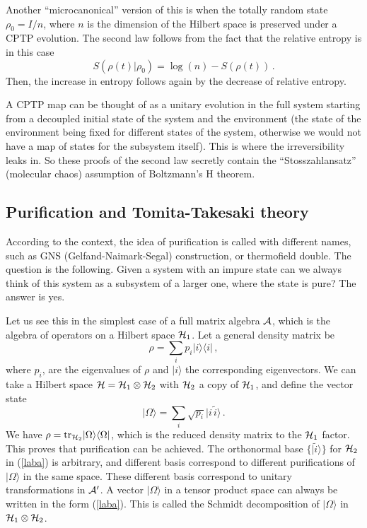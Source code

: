 \documentclass[12pt]{article}
\numberwithin{equation}{section}
\newcommand{\be}{\begin{equation}}
\newcommand{\ee}{\end{equation}}
\begin{document}
Another ``microcanonical'' version of this is
when the totally random state $\rho_0=I/n$, where $n$ is the dimension of the
Hilbert space is preserved under a CPTP evolution. 
 The second law follows from the fact that
the relative entropy is in this case
\begin{equation}
S(\rho(t)|\rho_0)=\log(n)-S(\rho(t))\,.
\end{equation}
Then, the increase in entropy follows again by the decrease of relative entropy.

A CPTP map can be thought of as a unitary evolution in the full system starting from a decoupled initial state of the system and the environment (the state of the environment being fixed for different states of the system, otherwise we would not have a map of states for the subsystem itself). This is where the irreversibility leaks in. So these proofs of the second law secretly contain the ``Stosszahlansatz'' (molecular chaos) assumption of Boltzmann's H theorem.     


\subsection{Purification and Tomita-Takesaki theory}
\label{tt}

According to the context, the idea of purification is called with different names, such as GNS (Gelfand-Naimark-Segal) construction, or thermofield double. The question is the following. Given a system with an impure state can we always think of this system as a subsystem of a larger one, where the state is pure? The answer is yes. 

Let us see this in the simplest case of a full matrix algebra ${\cal A}$, which is the algebra of operators on a Hilbert space ${\cal H}_1$. Let a general density matrix be 
\be
\rho=\sum_i p_i |i\rangle \langle i |\,,\label{dm}
\ee
 where $p_i$, are the eigenvalues of $\rho$ and $|i\rangle$ the corresponding eigenvectors. We can take a Hilbert space ${\cal H}={\cal H}_1\otimes {\cal H}_2$ with ${\cal H}_2$ a copy of ${\cal H}_1$, and define the vector state 
\begin{equation}
\vert \Omega \rangle = \sum_i \sqrt{p_i}  \vert i \,\tilde{i}\rangle\,.\label{laba}
\end{equation}
We have $\rho=\textrm{tr}_{{\cal H}_2}\vert \Omega\rangle \langle \Omega \vert$, which is the reduced density matrix to the ${\cal H}_1$ factor. This proves that purification can be achieved. 
The orthonormal base $\{\vert\tilde{i}\rangle\}$ for ${\cal H}_2$ in (\ref{laba}) is arbitrary, and different basis correspond to different purifications of $\vert \Omega \rangle$ in the same space. These different basis correspond to unitary transformations in ${\cal A}'$. A vector $\vert \Omega\rangle$ in a tensor product space can always be written in the form (\ref{laba}). This is called the Schmidt decomposition of $\vert \Omega \rangle$ in ${\cal H}_1\otimes {\cal H}_2$.
\end{document}
